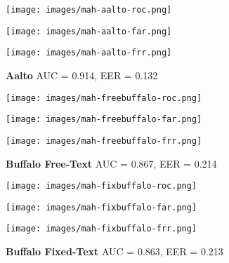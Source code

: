 \newpage
\begin{figure}[H]
    \centering
    \texttt{[image: images/mah-aalto-roc.png]}
\end{figure}
\begin{figure}[H]
    \centering
    \begin{minipage}{0.49\textwidth} %
        \centering
        \texttt{[image: images/mah-aalto-far.png]}
    \end{minipage}
    \hfill
    \begin{minipage}{0.49\textwidth} %
        \centering
        \texttt{[image: images/mah-aalto-frr.png]}
    \end{minipage}
    \caption{\textbf{Aalto } AUC = 0.914, EER = 0.132}
\end{figure}

\begin{figure}[H]
    \centering
    \texttt{[image: images/mah-freebuffalo-roc.png]}
\end{figure}
\begin{figure}[H]
    \centering
    \begin{minipage}{0.49\textwidth} %
        \centering
        \texttt{[image: images/mah-freebuffalo-far.png]}
    \end{minipage}
    \hfill
    \begin{minipage}{0.49\textwidth} %
        \centering
        \texttt{[image: images/mah-freebuffalo-frr.png]}
    \end{minipage}
    \caption{\textbf{Buffalo Free-Text } AUC = 0.867, EER = 0.214}
\end{figure}

\begin{figure}[H]
    \centering
    \texttt{[image: images/mah-fixbuffalo-roc.png]}
\end{figure}
\begin{figure}[H]
    \centering
    \begin{minipage}{0.49\textwidth} %
        \centering
        \texttt{[image: images/mah-fixbuffalo-far.png]}
    \end{minipage}
    \hfill
    \begin{minipage}{0.49\textwidth} %
        \centering
        \texttt{[image: images/mah-fixbuffalo-frr.png]}
    \end{minipage}
    \caption{\textbf{Buffalo Fixed-Text } AUC = 0.863, EER = 0.213}
\end{figure}

